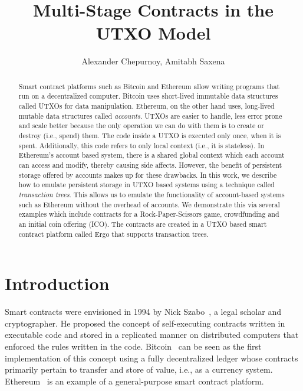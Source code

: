 \documentclass[runningheads]{llncs}
\begin{document}
\title{Multi-Stage Contracts in the UTXO Model}


\author{Alexander Chepurnoy, Amitabh Saxena}

\maketitle


\begin{abstract}

Smart contract platforms such as Bitcoin and Ethereum allow writing programs that run on a decentralized computer. Bitcoin uses short-lived immutable data structures called UTXOs for data manipulation. Ethereum, on the other hand uses, long-lived mutable data structures called {\em accounts}. UTXOs are easier to handle, less error prone and scale better because the only operation we can do with them  is to create or destroy (i.e., spend) them. The code inside a UTXO is executed only once, when it is spent. Additionally, this code refers to only local context (i.e., it is stateless). In Ethereum's account based system, there is a shared global context which each account can access and modify, thereby causing side affects. 
However, the benefit of persistent storage offered by accounts makes up for these drawbacks. 
In this work, we describe how to emulate persistent storage in UTXO based systems using a technique called {\em transaction trees}. This allows us to emulate the functionality of account-based systems such as Ethereum without the overhead of accounts. 
We demonstrate this via several examples which include contracts for a Rock-Paper-Scissors game, crowdfunding and an initial coin offering (ICO). The contracts are created in a UTXO based smart contract platform called Ergo that supports transaction trees. 
\end{abstract}


\section{Introduction}

Smart contracts were envisioned in 1994 by Nick Szabo~\cite{szabo1997idea}, a legal scholar and cryptographer. He proposed the concept of self-executing contracts written in executable code and stored in a replicated manner on distributed computers that enforced the rules written in the code. 
Bitcoin~\cite{Nak08} can be seen as the first implementation of this concept using a fully decentralized ledger whose contracts primarily pertain to transfer and store of value, i.e., as a currency system. 
Ethereum~\cite{wood2014ethereum} is an example of a general-purpose smart contract platform. 
\end{document}
